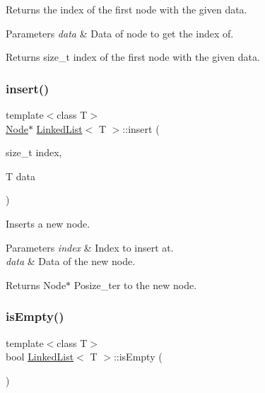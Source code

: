 Returns the index of the first node with the given data. 


\begin{DoxyParams}{Parameters}
{\em data} & Data of node to get the index of. \\
\hline
\end{DoxyParams}
\begin{DoxyReturn}{Returns}
size\+\_\+t index of the first node with the given data. 
\end{DoxyReturn}
\mbox{\label{classLinkedList_ae5e1ea8a9bbb18d9483db99b44479566}} 
\subsubsection{\texorpdfstring{insert()}{insert()}}
{\footnotesize\ttfamily template$<$class T$>$ \\
\hyperlink{structLinkedList_1_1Node}{Node}$\ast$ \hyperlink{classLinkedList}{Linked\+List}$<$ T $>$\+::insert (\begin{DoxyParamCaption}\item[{size\+\_\+t}]{index,  }\item[{T}]{data }\end{DoxyParamCaption})\hspace{0.3cm}{\ttfamily [inline]}}



Inserts a new node. 


\begin{DoxyParams}{Parameters}
{\em index} & Index to insert at. \\
\hline
{\em data} & Data of the new node. \\
\hline
\end{DoxyParams}
\begin{DoxyReturn}{Returns}
Node$\ast$ Posize\+\_\+ter to the new node. 
\end{DoxyReturn}
\mbox{\label{classLinkedList_a7ecbb28e82117a680839ed0dc28ebdce}} 
\subsubsection{\texorpdfstring{is\+Empty()}{isEmpty()}}
{\footnotesize\ttfamily template$<$class T$>$ \\
bool \hyperlink{classLinkedList}{Linked\+List}$<$ T $>$\+::is\+Empty (\begin{DoxyParamCaption}{ }\end{DoxyParamCaption})\hspace{0.3cm}{\ttfamily [inline]}}



